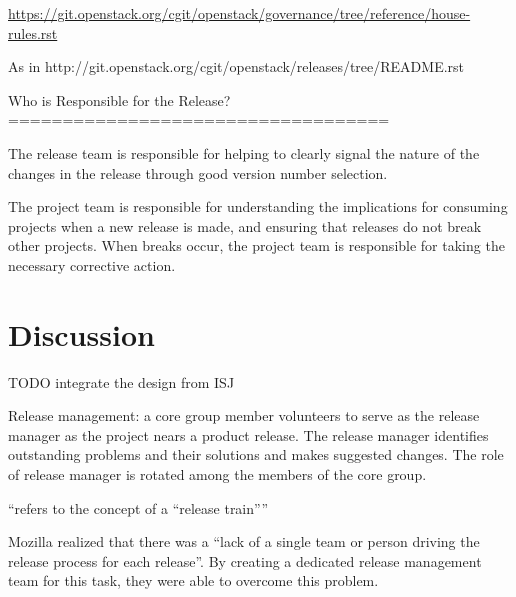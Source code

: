 \documentclass[dvipsnames]{interact}
\theoremstyle{plain}\newtheorem{theorem}{Theorem}[section]
\theoremstyle{definition}
\theoremstyle{remark}
\newenvironment{newStuff}{
    \begin{color}{Sepia}
    \begin{tabular}{|p{1.0\textwidth}|}
    \hline\\
    }
    { 
    \\\\\hline
    \end{tabular} 
    \end{color}
    }
\renewenvironment{newStuff}{}{}
\begin{document}
\begin{newStuff}
{\url{https://git.openstack.org/cgit/openstack/governance/tree/reference/house-rules.rst}




As in http://git.openstack.org/cgit/openstack/releases/tree/README.rst

Who is Responsible for the Release?
===================================

The release team is responsible for helping to clearly signal the
nature of the changes in the release through good version number
selection.

The project team is responsible for understanding the implications for
consuming projects when a new release is made, and ensuring that
releases do not break other projects. When breaks occur, the project
team is responsible for taking the necessary corrective action.
}
{}


\section{Discussion}





\begin{newStuff}
 TODO integrate the design from ISJ \citep{SharmaSugumaran_et_al2002} 
 
Release management: a core group member volunteers to serve as the release manager
as the project nears a product release. The release manager identifies outstanding problems
and  their  solutions  and  makes  suggested  changes. The  role  of  release  manager  is  rotated
among the members of  the core group.


``refers to the concept of a “release train”''\citep{KhomhAdams_et_al2015}




Mozilla realized that there was a “lack of a single team or person driving the release process for each release”. By creating a dedicated release management team for this task, they were able to overcome this problem. \citep{KhomhAdams_et_al2015}




\end{newStuff}
\end{newStuff}
\end{document}
